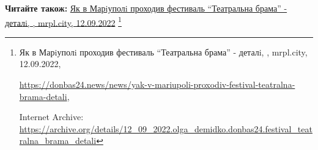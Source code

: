  
 
 
 
 

\def\pubIA{https://archive.org/details/12_09_2022.olga_demidko.donbas24.festival_teatralna_brama_detali}
\def\pubTitle{Як в Марiуполi проходив фестиваль \enquote{Театральна брама} - деталi}
\def\pubDate{12.09.2022}
\def\pubOrigin{https://donbas24.news/news/yak-v-mariupoli-proxodiv-festival-teatralna-brama-detali}
\def\pubAuthor{\pubAuthorDemidko}

\textbf{Читайте також:} \href{\pubIA}{%
\pubTitle, \pubAuthor, mrpl.city, \pubDate}%
\footnote{\pubTitle, \pubAuthor, mrpl.city, \pubDate, \par\url{\pubOrigin}, \par Internet Archive: \url{\pubIA}}
